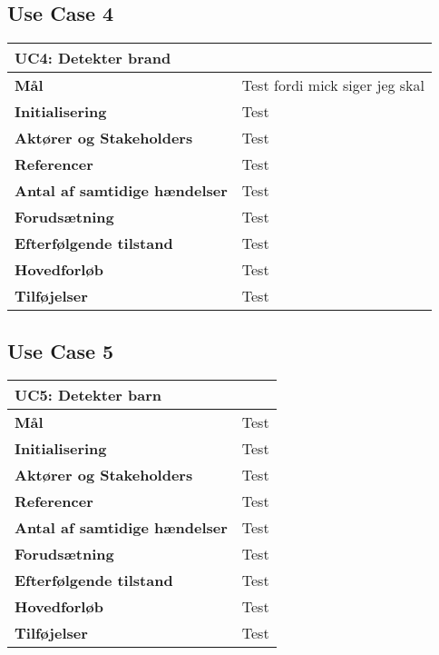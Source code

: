 \subsection{Use Case 4}
\begin{table}[H] \centering
\begin{tabular}{|p{6cm}|p{8cm}|} 
	\hline
\multicolumn{2}{|l|}{\textbf{UC4: Detekter brand}} \\\hline
\textbf{Mål}								&Test fordi mick siger jeg skal  \\\hline
\textbf{Initialisering}					&Test \\\hline
\textbf{Aktører og Stakeholders}			&Test \\\hline
\textbf{Referencer}						&Test \\\hline
\textbf{Antal af samtidige hændelser}	&Test \\\hline
\textbf{Forudsætning}					&Test \\\hline
\textbf{Efterfølgende tilstand}			&Test \\\hline
\textbf{Hovedforløb}						&Test \\\hline
\textbf{Tilføjelser}						&Test \\\hline
	\end{tabular}
	\label{UC4} 
\end{table}

\subsection{Use Case 5}
\begin{table}[H] \centering
\begin{tabular}{|p{6cm}|p{8cm}|} 
	\hline
\multicolumn{2}{|l|}{\textbf{UC5: Detekter barn}} \\\hline
\textbf{Mål}								&Test \\\hline
\textbf{Initialisering}					&Test \\\hline
\textbf{Aktører og Stakeholders}			&Test \\\hline
\textbf{Referencer}						&Test \\\hline
\textbf{Antal af samtidige hændelser}	&Test \\\hline
\textbf{Forudsætning}					&Test \\\hline
\textbf{Efterfølgende tilstand}			&Test \\\hline
\textbf{Hovedforløb}						&Test \\\hline
\textbf{Tilføjelser}						&Test \\\hline
	\end{tabular}
	\label{UC5} 
\end{table}

